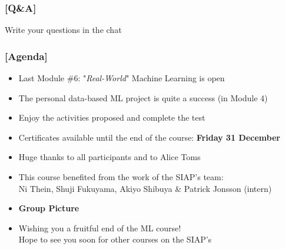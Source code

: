 \documentclass[xcolor=x11names,compress, aspectratio=169]{beamer}
\renewcommand{\(}{\begin{columns}}
\renewcommand{\)}{\end{columns}}
\newcommand{\<}[1]{\begin{column}{#1}}
\renewcommand{\>}{\end{column}}
\begin{document}
\begin{frame} %
\frametitle{\textcolor{brique}{[Q\&A]}}
\begin{center}
\Large \textcolor{siap}{ Write your questions in the chat}
\end{center}
\end{frame}

\begin{frame} %
\frametitle{\textcolor{brique}{[Agenda]}}
\pause
\begin{itemize}[<+->]
    \item Last Module \#6: "\textit{Real-World}" Machine Learning is open
    \item The personal data-based ML  project is quite a success (in Module 4)
    \item Enjoy the activities proposed  and complete the test \\
    \item Certificates available until the end of the course: \textbf{Friday 31 December}
    \item Huge thanks to all participants and to Alice Toms
    \item This course benefited from the work of the SIAP's team:\\
     Ni Thein, Shuji Fukuyama, Akiyo Shibuya \& Patrick Jonsson (intern)
    \item[] \begin{center} \textcolor{brique}{\Large \textbf{Group Picture}} \end{center}
    \item[] \begin{center}
                \Large \textcolor{siap}{Wishing you a fruitful end of the ML course! \\ Hope to see you soon for other courses on the SIAP's}
            \end{center}
\end{itemize}
\end{frame}
\end{document}
